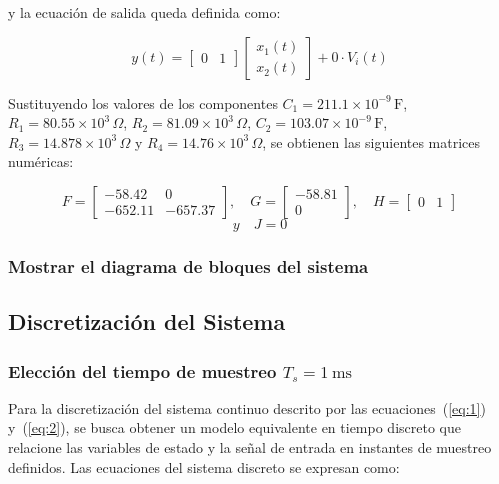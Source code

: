y la ecuación de salida queda definida como:

\[
y(t) =
\begin{bmatrix}
	0 & 1
\end{bmatrix}
\begin{bmatrix}
	x_1(t) \\[4pt]
	x_2(t)
\end{bmatrix}
+ 0\cdot V_i(t)
\]

Sustituyendo los valores de los componentes 
$C_1 = 211.1\times10^{-9}\,\text{F}$, 
$R_1 = 80.55\times10^{3}\,\Omega$, 
$R_2 = 81.09\times10^{3}\,\Omega$, 
$C_2 = 103.07\times10^{-9}\,\text{F}$, 
$R_3 = 14.878\times10^{3}\,\Omega$ y 
$R_4 = 14.76\times10^{3}\,\Omega$, 
se obtienen las siguientes matrices numéricas:

\[
F =
\begin{bmatrix}
	-58.42 & 0 \\[4pt]
	-652.11 & -657.37
\end{bmatrix}, \quad
G =
\begin{bmatrix}
	-58.81 \\[4pt]
	0
\end{bmatrix}, \quad
H =
\begin{bmatrix}
	0 & 1
\end{bmatrix}
\]
\begin{equation}
	y \quad
	J = 0
	\label{eq:J}
\end{equation}
\subsubsection{Mostrar el diagrama de bloques del sistema}


\subsection{Discretización del Sistema}

\subsubsection{Elección del tiempo de muestreo $T_s = 1~\text{ms}$}

Para la discretización del sistema continuo descrito por las ecuaciones~(\ref{eq:1}) y~(\ref{eq:2}), se busca obtener un modelo equivalente en tiempo discreto que relacione las variables de estado y la señal de entrada en instantes de muestreo definidos.  
Las ecuaciones del sistema discreto se expresan como:

